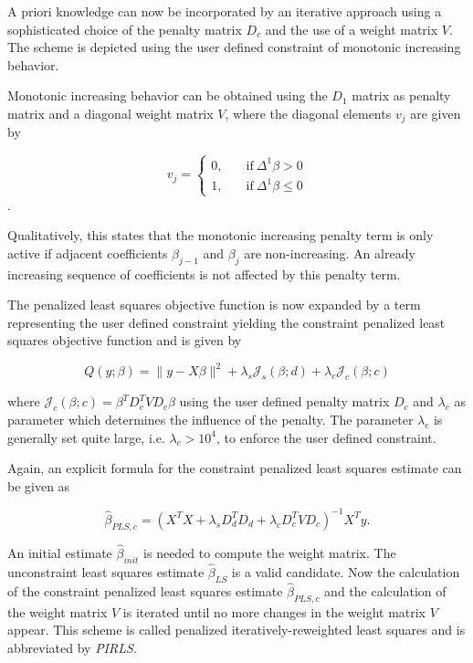 \documentclass[10pt,a4paper]{article}
\begin{document}
	A priori knowledge can now be incorporated by an iterative approach using a sophisticated choice of the penalty matrix $D_c$ and the use of a weight matrix $V$. The scheme is depicted using the user defined constraint of monotonic increasing behavior.  
	
	Monotonic increasing behavior can be obtained using the $D_1$ matrix as penalty matrix and a diagonal weight matrix $V$, where the diagonal elements $v_j$ are given by
	
	$$v_j = \begin{cases} 0, & \quad \text{if} \ \Delta^1 \beta > 0 \\ 
						  1, & \quad \text{if} \ \Delta^1 \beta \le 0 
		 	\end{cases}$$.
	
	Qualitatively, this states that the monotonic increasing penalty term is only active if adjacent coefficients $\beta_{j-1}$ and $\beta_j$ are non-increasing. An already increasing sequence of coefficients is not affected by this penalty term. 
	
	The penalized least squares objective function is now expanded by a term representing the user defined constraint yielding the constraint penalized least squares objective function and is given by
	
	$$Q(y; \beta) = \lVert y - X\beta \rVert^2 + \lambda_s \mathcal J_s(\beta; d) + \lambda_c \mathcal J_c(\beta; c) $$
	
	where $\mathcal J_c(\beta; c) = \beta^T D_c^T V D_c \beta$ using the user defined penalty matrix $D_c$ and $\lambda_c$ as parameter which determines the influence of the penalty. The parameter $\lambda_c$ is generally set quite large, i.e. $\lambda_c > 10^4$, to enforce the user defined constraint. 
	
	Again, an explicit formula for the constraint penalized least squares estimate can be given as
	
	$$\hat \beta_{PLS,c} = (X^TX + \lambda_s D_d^T D_d  + \lambda_c D_c^T V D_c)^{-1} X^T y.$$
	
	An initial estimate $\hat \beta_{init}$ is needed to compute the weight matrix. The unconstraint least squares estimate $\hat \beta_{LS}$ is a valid candidate. Now the calculation of the constraint penalized least squares estimate $\hat \beta_{PLS, c}$ and the calculation of the weight matrix $V$ is iterated until no more changes in the weight matrix $V$ appear. This scheme is called penalized iteratively-reweighted least squares and is abbreviated by \emph{PIRLS}. 
	
\end{document}
